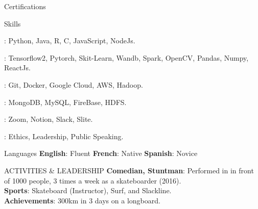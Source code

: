 \documentclass{resume}
\begin{document}
\begin{multicols}{2}
\begin{rSection}{\Large Certifications}
\begin{description}
		\end{description}
	\end{rSection}

	\begin{rSection}{\Large Skills}
		\begin{description}
			\setlength\itemsep{-0.5em}
			\item[$\bullet$ Languages]: Python, Java, R, C, JavaScript, NodeJs.
			\item[$\bullet$ Libraries]: Tensorflow2, Pytorch, Skit-Learn, Wandb, Spark, OpenCV, Pandas, Numpy, ReactJs.
			\item[$\bullet$ Tools]: Git, Docker, Google Cloud, AWS, Hadoop.
			\item[$\bullet$ Databases]: MongoDB, MySQL, FireBase, HDFS.
			\item[$\bullet$ Teamwork]: Zoom, Notion, Slack, Slite.
			\item[$\bullet$ Soft Skills]: Ethics, Leadership, Public Speaking.
		\end{description}
	\end{rSection}

	\begin{rSection}{\Large Languages}
		\textbf{English}:  Fluent \hspace{1ex} \textbf{French}: Native \hspace{1ex} \textbf{Spanish}:  Novice
	\end{rSection}

	\begin{rSection}{\Large ACTIVITIES \& LEADERSHIP}
		\textbf{Comedian, Stuntman}: Performed in  in front of 1000 people, 3 times a week as a skateboarder (2016).\\
		\textbf{Sports}: Skateboard (Instructor), Surf, and Slackline.\\
		\textbf{Achievements}: 300km in 3 days on a longboard.
	\end{rSection}
	
	\end{multicols}
\end{document}
